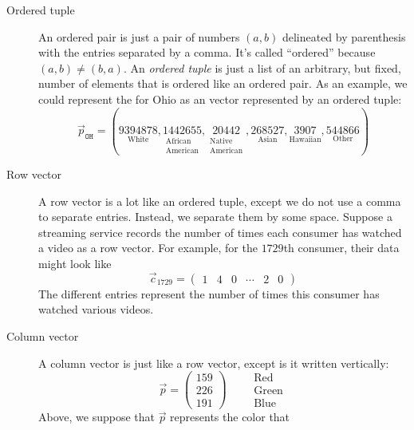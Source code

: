 \documentclass{ximera}
\begin{document}
\begin{concept}
\begin{description}
\item[Ordered tuple] An ordered pair is just a pair of numbers
  $(a,b)$ delineated by parenthesis with the entries separated by a
  comma. It's called ``ordered'' because $(a,b) \ne (b,a)$. An \textit{ordered
  tuple} is just a list of an arbitrary, but fixed, number of elements
  that is ordered like an ordered pair. As an example, we could
  represent the  for Ohio as an vector
  represented by an ordered tuple:
  \[
  \vec{p}_{\texttt{OH}} = (\underset{\text{White}}{9394878},\underset{\begin{smallmatrix}\text{African}\\ \text{American}\end{smallmatrix}}{1442655},\underset{\begin{smallmatrix}\text{Native}\\\text{American}\end{smallmatrix}}{20442},\underset{\text{Asian}}{268527},\underset{\text{Hawaiian}}{3907},\underset{\text{Other}}{544866})
  \]
\item[Row vector] A row vector is a lot like an ordered tuple, except
  we do not use a comma to separate entries. Instead, we separate them
  by some space.  Suppose a streaming service records the number of
  times each consumer has watched a video as a row vector. For
  example, for the $1729$th consumer, their data might look like
  \[
  \vec c_{1729} = \begin{pmatrix} 1 & 4 & 0 & \cdots & 2 & 0 \end{pmatrix}
  \]
  The different entries represent the number of times this consumer
  has watched various videos.
  \item[Column vector] A column vector is just like a row vector,
  except is it written vertically:
  \[
  \vec{p} = \begin{pmatrix}
    159\\  226 \\ 191\end{pmatrix}
    \qquad
    \begin{array}{l}
    \text{Red}\\
    \text{Green}\\
    \text{Blue}
    \end{array}
  \]
  Above, we suppose that $\vec{p}$ represents the color that

\end{description}
\end{concept}
\end{document}
